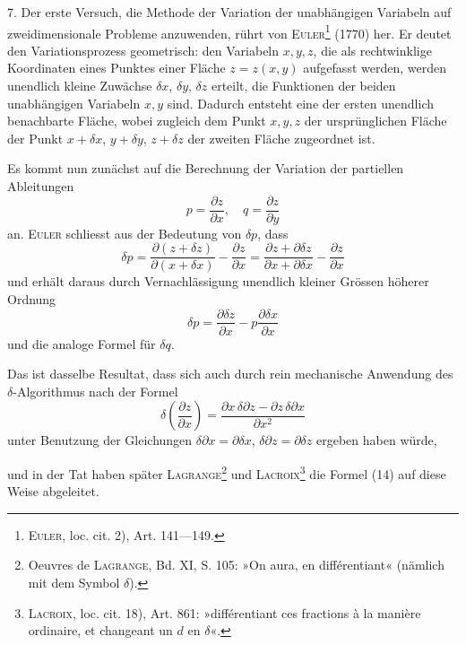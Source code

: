 \clearpage\begingroup\NoSourceHead
\makeatletter\tagsleft@true\let\veqno\@@leqno\makeatother
\renewcommand{\thefootnote}{\arabic{footnote})}\setcounter{footnote}{18}
\noindent\hspace*{\parindent}7. Der erste Versuch, die Methode der Variation der unabhängigen Variabeln
auf zweidimensionale Probleme anzuwenden, rührt von \textsc{Euler}\footnote{\textsc{Euler}, loc. cit. 2), Art. 141—149.} (1770)
her. Er deutet den Variationsprozess geometrisch: den Variabeln $x,y,z$, die
als rechtwinklige Koordinaten eines Punktes einer Fläche $z=z(x,y)$ aufgefasst
werden, werden unendlich kleine Zuwächse $\delta x$, $\delta y$, $\delta z$ erteilt, die Funktionen
der beiden unabhängigen Variabeln $x,y$ sind. Dadurch entsteht eine der
ersten unendlich benachbarte Fläche, wobei zugleich dem Punkt $x,y,z$ der
ursprünglichen Fläche der Punkt $x+\delta x$, $y+\delta y$, $z+\delta z$ der zweiten Fläche
zugeordnet ist.

Es kommt nun zunächst auf die Berechnung der Variation der partiellen
Ableitungen
\[
p=\frac{\partial z}{\partial x},\quad q=\frac{\partial z}{\partial y}
\]
an. \textsc{Euler} schliesst aus der Bedeutung von $\delta p$, dass
\[
\delta p=\frac{\partial(z+\delta z)}{\partial(x+\delta x)}-\frac{\partial z}{\partial x}
=\frac{\partial z+\partial\delta z}{\partial x+\partial\delta x}-\frac{\partial z}{\partial x}
\]
und erhält daraus durch Vernachlässigung unendlich kleiner Grössen höherer
Ordnung
\begin{equation*}
\delta p=\frac{\partial\delta z}{\partial x}-p\frac{\partial\delta x}{\partial x}\tag{14}
\end{equation*}
und die analoge Formel für $\delta q$.

Das ist dasselbe Resultat, dass sich auch durch rein mechanische Anwendung
des $\delta$-Algorithmus nach der Formel
\[
\delta\left(\frac{\partial z}{\partial x}\right)
=\frac{\partial x\,\delta\partial z-\partial z\,\delta\partial x}{\partial x^2}
\]
unter Benutzung der Gleichungen $\delta\partial x=\partial\delta x$, $\delta\partial z=\partial\delta z$ ergeben haben würde,
\par\clearpage{}
\noindent und in der Tat haben später \textsc{Lagrange}\footnote{Oeuvres de \textsc{Lagrange}, Bd. XI, S. 105: »On aura, en différentiant« (nämlich mit dem Symbol $\delta$).} und \textsc{Lacroix}\footnote{\textsc{Lacroix}, loc. cit. 18), Art. 861: »différentiant ces fractions à la manière ordinaire, et changeant un $d$ en $\delta$«.} die Formel (14) auf
diese Weise abgeleitet.

